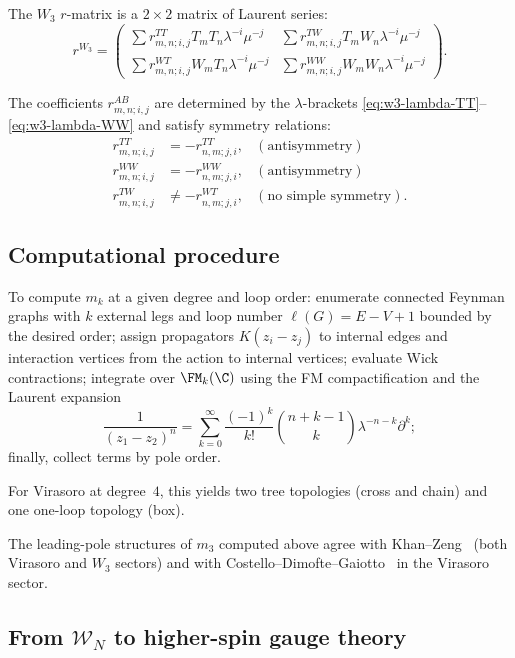 The $W_3$ $r$-matrix is a $2 \times 2$ matrix of Laurent series:
\begin{equation}
r^{W_3} = \begin{pmatrix}
\sum r^{TT}_{m,n; i,j} T_m T_n \lambda^{-i} \mu^{-j} & \sum r^{TW}_{m,n; i,j} T_m W_n \lambda^{-i} \mu^{-j}\\
\sum r^{WT}_{m,n; i,j} W_m T_n \lambda^{-i} \mu^{-j} & \sum r^{WW}_{m,n; i,j} W_m W_n \lambda^{-i} \mu^{-j}
\end{pmatrix}.
\end{equation}

The coefficients $r^{AB}_{m,n; i,j}$ are determined by the $\lambda$-brackets \eqref{eq:w3-lambda-TT}--\eqref{eq:w3-lambda-WW} and satisfy symmetry relations:
\begin{align}
r^{TT}_{m,n; i,j} &= -r^{TT}_{n,m; j,i}, & (\text{antisymmetry})\\
r^{WW}_{m,n; i,j} &= -r^{WW}_{n,m; j,i}, & (\text{antisymmetry})\\
r^{TW}_{m,n; i,j} &\neq -r^{WT}_{n,m; j,i}, & (\text{no simple symmetry}).
\end{align}

\subsection{Computational procedure}

To compute $m_k$ at a given degree and loop order:
enumerate connected Feynman graphs with $k$ external legs and
loop number $\ell(G) = E - V + 1$ bounded by the desired order;
assign propagators $K(z_i - z_j)$ to internal edges and
interaction vertices from the action to internal vertices;
evaluate Wick contractions; integrate over $\FM_k(\C)$
using the FM compactification and the Laurent expansion
\[
\frac{1}{(z_1-z_2)^n}
= \sum_{k=0}^\infty \frac{(-1)^k}{k!}
 \binom{n+k-1}{k} \lambda^{-n-k} \partial^k;
\]
finally, collect terms by pole order.

For Virasoro at degree~$4$, this yields
two tree topologies (cross and chain) and one
one-loop topology (box).

The leading-pole structures of $m_3$ computed above agree with
Khan--Zeng~\cite{KZ25} (both Virasoro and $W_3$ sectors) and with
Costello--Dimofte--Gaiotto~\cite{CDG20} in the Virasoro sector.


\subsection{From \texorpdfstring{$\mathcal{W}_N$}{W\_N} to higher-spin gauge theory}
\label{subsec:wn-higher-spin}

